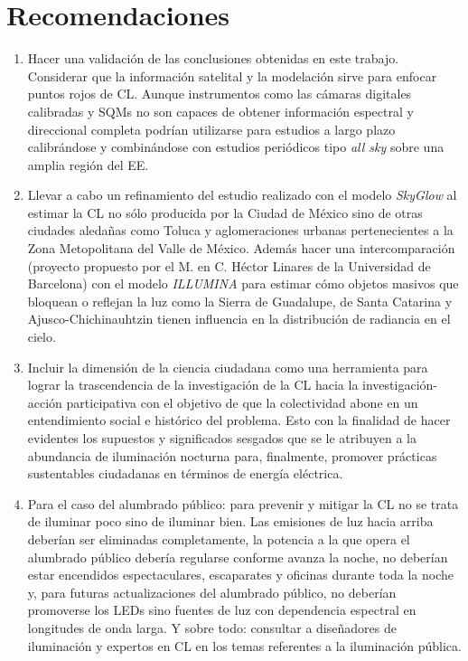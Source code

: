 \chapter{Recomendaciones}
\label{chap:recomendaciones}


\begin{enumerate}[I]

\item Hacer una validación de las conclusiones obtenidas en este trabajo. Considerar que la información satelital y la modelación sirve para enfocar puntos rojos de CL. Aunque instrumentos como las cámaras digitales calibradas y SQMs no son capaces de obtener información espectral y direccional completa podrían utilizarse para estudios a largo plazo calibrándose y combinándose con estudios periódicos tipo \textit{all sky} sobre una amplia región del EE.

\item Llevar a cabo un refinamiento del estudio realizado con el modelo \textit{SkyGlow} al estimar la CL no sólo producida por la Ciudad de México sino de otras ciudades aledañas como Toluca y aglomeraciones urbanas pertenecientes a la Zona Metopolitana del Valle de México. Además hacer una intercomparación (proyecto propuesto por el M. en C. Héctor Linares de la Universidad de Barcelona) con el modelo \textit{ILLUMINA} para estimar cómo objetos masivos que bloquean o reflejan la luz como la Sierra de Guadalupe, de Santa Catarina y Ajusco-Chichinauhtzin tienen influencia en la distribución de radiancia en el cielo.

\item Incluir la dimensión de la ciencia ciudadana como una herramienta para lograr la trascendencia de la investigación de la CL hacia la investigación-acción participativa con el objetivo de que la colectividad abone en un entendimiento social e histórico del problema. Esto con la finalidad de hacer evidentes los supuestos y significados sesgados que se le atribuyen a la abundancia de iluminación nocturna para, finalmente, promover prácticas sustentables ciudadanas en términos de energía eléctrica. 

\item Para el caso del alumbrado público: para prevenir y mitigar la CL no se trata de iluminar poco sino de iluminar bien. Las emisiones de luz hacia arriba deberían ser eliminadas completamente, la potencia a la que opera el alumbrado público debería regularse conforme avanza la noche, no deberían estar encendidos espectaculares, escaparates y oficinas durante toda la noche y, para futuras actualizaciones del alumbrado público, no deberían promoverse los LEDs sino fuentes de luz con dependencia espectral en longitudes de onda larga. Y sobre todo: consultar a diseñadores de iluminación y expertos en CL en los temas referentes a la iluminación pública.


\end{enumerate}
